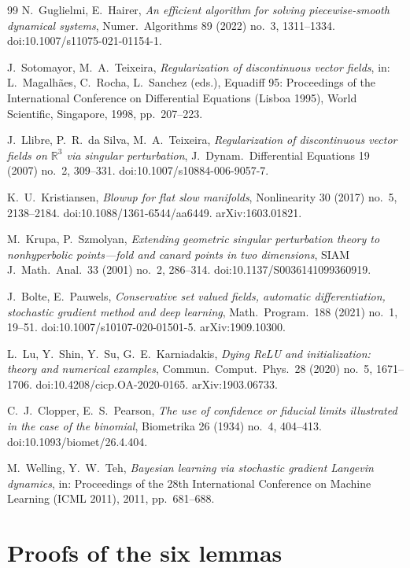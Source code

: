 \documentclass[11pt]{article}
\theoremstyle{definition}
\theoremstyle{remark}
\begin{document}
\begin{thebibliography}{99}
 N.~Guglielmi, E.~Hairer, \emph{An efficient algorithm for solving
piecewise-smooth dynamical systems}, Numer.\ Algorithms 89 (2022) no.~3,
1311--1334. doi:10.1007/s11075-021-01154-1.

 J.~Sotomayor, M.~A.~Teixeira, \emph{Regularization of
discontinuous vector fields}, in: L.~Magalh\~aes, C.~Rocha, L.~Sanchez (eds.),
Equadiff 95: Proceedings of the International Conference on Differential
Equations (Lisboa 1995), World Scientific, Singapore, 1998, pp.~207--223.

 J.~Llibre, P.~R.~da Silva, M.~A.~Teixeira, \emph{Regularization
of discontinuous vector fields on $\mathbb{R}^3$ via singular perturbation},
J.~Dynam.\ Differential Equations 19 (2007) no.~2, 309--331.
doi:10.1007/s10884-006-9057-7.

 K.~U.~Kristiansen, \emph{Blowup for flat slow manifolds},
Nonlinearity 30 (2017) no.~5, 2138--2184. doi:10.1088/1361-6544/aa6449.
arXiv:1603.01821.

 M.~Krupa, P.~Szmolyan, \emph{Extending geometric singular
perturbation theory to nonhyperbolic points---fold and canard points in two
dimensions}, SIAM J.~Math.\ Anal.\ 33 (2001) no.~2, 286--314.
doi:10.1137/S0036141099360919.

 J.~Bolte, E.~Pauwels, \emph{Conservative set valued fields,
automatic differentiation, stochastic gradient method and deep learning},
Math.\ Program.\ 188 (2021) no.~1, 19--51. doi:10.1007/s10107-020-01501-5.
arXiv:1909.10300.

 L.~Lu, Y.~Shin, Y.~Su, G.~E.~Karniadakis, \emph{Dying ReLU and
initialization: theory and numerical examples}, Commun.\ Comput.\ Phys.\ 28
(2020) no.~5, 1671--1706. doi:10.4208/cicp.OA-2020-0165. arXiv:1903.06733.

 C.~J.~Clopper, E.~S.~Pearson, \emph{The use of confidence or
fiducial limits illustrated in the case of the binomial}, Biometrika 26 (1934)
no.~4, 404--413. doi:10.1093/biomet/26.4.404.

 M.~Welling, Y.~W.~Teh, \emph{Bayesian learning via stochastic
gradient Langevin dynamics}, in: Proceedings of the 28th International Conference
on Machine Learning (ICML 2011), 2011, pp.~681--688.

\end{thebibliography}

\appendix
\section{Proofs of the six lemmas}\label{app:lemmas}
\end{document}
